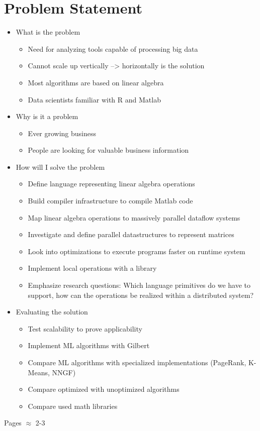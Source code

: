 \chapter{Problem Statement}
\label{cha:problemstatement}


\begin{itemize}
	\item What is the problem
	\begin{itemize}
		\item Need for analyzing tools capable of processing big data
		\item Cannot scale up vertically --> horizontally is the solution
		\item Most algorithms are based on linear algebra
		\item Data scientists familiar with R and Matlab
	\end{itemize}
	\item Why is it a problem
	\begin{itemize}
		\item Ever growing business
		\item People are looking for valuable business information
	\end{itemize}
	\item How will I solve the problem
	\begin{itemize}
		\item Define language representing linear algebra operations
		\item Build compiler infrastructure to compile Matlab code
		\item Map linear algebra operations to massively parallel dataflow systems
		\item Investigate and define parallel datastructures to represent matrices
		\item Look into optimizations to execute programs faster on runtime system
		\item Implement local operations with a library
		\item Emphasize research questions: Which language primitives do we have to support, how can the operations be realized within a distributed system?
	\end{itemize}
	\item Evaluating the solution
	\begin{itemize}
		\item Test scalability to prove applicability
		\item Implement ML algorithms with Gilbert
		\item Compare ML algorithms with specialized implementations (PageRank, K-Means, NNGF)
		\item Compare optimized with unoptimized algorithms
		\item Compare used math libraries
	\end{itemize}
\end{itemize}

Pages $\approx$ 2-3